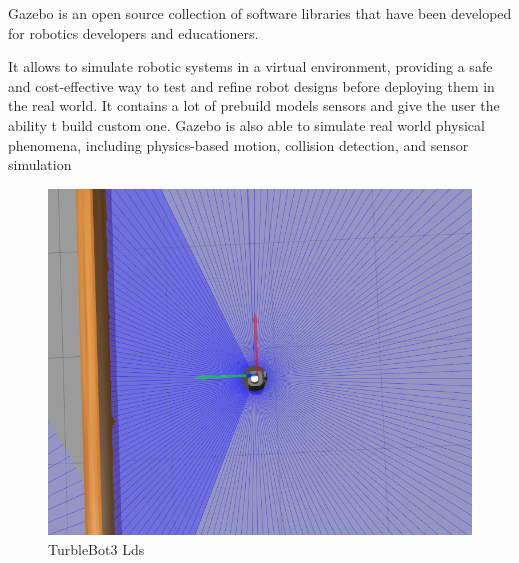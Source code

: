 \documentclass[12pt]{extarticle}
\begin{document}
Gazebo is an open source collection of software libraries that have been developed for robotics developers and educationers.

It allows  to simulate  robotic systems in a virtual environment, providing a safe and cost-effective way to test and refine robot designs before deploying them in the real world. It contains a lot of prebuild models sensors and give the user the ability t build custom one. Gazebo is also able to simulate real world physical phenomena, including physics-based motion, collision detection, and sensor simulation



  
 \begin{figure}[h]  
\centering
\includegraphics[scale=0.4]{lds.png}
\caption[Lds]{TurbleBot3 Lds}
\end{figure}
















 


\newpage


\end{document}
